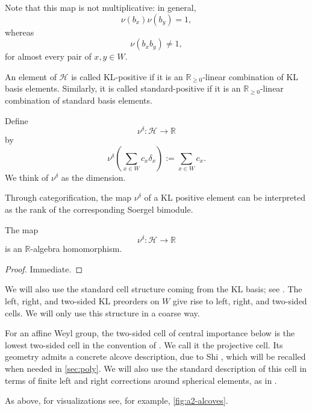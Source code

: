 \documentclass[a4paper,11pt]{amsart}
\newcommand{\R}{\mathbb{R}}
\newcommand{\ra}{\rightarrow}
\newcommand{\Hecke}{\mc H}
\newcommand{\mc}{\mathcal}
\numberwithin{equation}{subsection}
\theoremstyle{definition}
\theoremstyle{remark}
\begin{document}
Note that this map is not multiplicative: in general,
\[
\nu(b_x)\nu(b_y)=1,
\]
whereas
\[
\nu(b_xb_y)\neq 1,
\]
for almost every pair of $x,y \in W$.

\begin{Definition}
An element of $\Hecke$ is called KL-positive if it is an
$\R_{\geq 0}$-linear combination of KL basis elements. Similarly, it is called
standard-positive if it is an $\R_{\geq 0}$-linear combination of
standard basis elements.
\end{Definition}

\begin{Definition}
Define
\[
\nu^\delta\colon \Hecke\ra \R
\]
by
\[
\nu^\delta\left(\sum_{x\in W} c_x\delta_x\right)
:=
\sum_{x\in W} c_x.
\]
We think of $\nu^\delta$ as the dimension.
\end{Definition}

\begin{Remark}
 Through
categorification, the map $\nu^\delta$ of a KL positive element can be interpreted as the rank of
the corresponding Soergel bimodule. 
\end{Remark}

\begin{Lemma}\label{nu_del ringhom}
The map
\[
\nu^\delta\colon \Hecke\ra \R
\]
is an $\R$-algebra homomorphism.
\end{Lemma}

\begin{proof}
Immediate.
\end{proof}

We will also use the standard cell structure coming from the KL basis; see
\cite{KaLu-coxeter-hecke}. The left, right, and two-sided KL preorders on $W$
give rise to left, right, and two-sided cells. We will only use this structure
in a coarse way.

For an affine Weyl group, the two-sided cell of central importance below is
the lowest two-sided cell in the convention of \cite{Shi-two-sided-cell-I,Shi-two-sided-cell-II}. We call it the projective cell. Its geometry
admits a concrete alcove description, due to Shi
\cite{Shi-two-sided-cell-I,Shi-two-sided-cell-II}, which will be recalled
when needed in \autoref{sec:poly}. We will also use the standard description
of this cell in terms of finite left and right corrections around spherical
elements, as in
\cite{LuXi-canonical-left-cells,Xi-lowest-based-ring-II}.

\begin{Example}
As above, for visualizations see, for example,
\autoref{fig:a2-alcoves}.
\end{Example}
\end{document}

